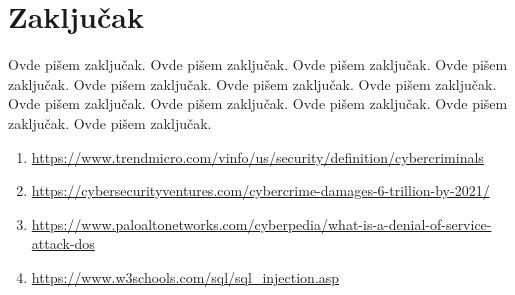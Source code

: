 \documentclass[a4paper]{article}
\begin{document}
\section{Zaključak}
\label{sec:zakljucak}

Ovde pišem zaključak. 
Ovde pišem zaključak. 
Ovde pišem zaključak. 
Ovde pišem zaključak. 
Ovde pišem zaključak. 
Ovde pišem zaključak. 
Ovde pišem zaključak. 
Ovde pišem zaključak. 
Ovde pišem zaključak. 
Ovde pišem zaključak. 
Ovde pišem zaključak. 
Ovde pišem zaključak.

 

\appendix
 

\begin{enumerate}
\item \url{https://www.trendmicro.com/vinfo/us/security/definition/cybercriminals}
\item \url{https://cybersecurityventures.com/cybercrime-damages-6-trillion-by-2021/} 
\item \url{https://www.paloaltonetworks.com/cyberpedia/what-is-a-denial-of-service-attack-dos}
\item \url{https://www.w3schools.com/sql/sql_injection.asp}
\end{enumerate}
\end{document}
